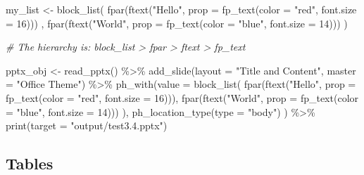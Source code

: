 \documentclass[
]{book}
\newenvironment{Shaded}{\begin{snugshade}}{\end{snugshade}}
\newcommand{\AttributeTok}[1]{\textcolor[rgb]{0.77,0.63,0.00}{#1}}
\newcommand{\CommentTok}[1]{\textcolor[rgb]{0.56,0.35,0.01}{\textit{#1}}}
\newcommand{\DecValTok}[1]{\textcolor[rgb]{0.00,0.00,0.81}{#1}}
\newcommand{\FunctionTok}[1]{\textcolor[rgb]{0.00,0.00,0.00}{#1}}
\newcommand{\NormalTok}[1]{#1}
\newcommand{\OtherTok}[1]{\textcolor[rgb]{0.56,0.35,0.01}{#1}}
\newcommand{\SpecialCharTok}[1]{\textcolor[rgb]{0.00,0.00,0.00}{#1}}
\newcommand{\StringTok}[1]{\textcolor[rgb]{0.31,0.60,0.02}{#1}}
\begin{document}
\begin{Shaded}
\begin{Highlighting}[]
\NormalTok{my\_list }\OtherTok{\textless{}{-}} \FunctionTok{block\_list}\NormalTok{(}
  \FunctionTok{fpar}\NormalTok{(}\FunctionTok{ftext}\NormalTok{(}\StringTok{"Hello"}\NormalTok{, }\AttributeTok{prop =} \FunctionTok{fp\_text}\NormalTok{(}\AttributeTok{color =} \StringTok{"red"}\NormalTok{, }\AttributeTok{font.size =} \DecValTok{16}\NormalTok{))) ,}
  \FunctionTok{fpar}\NormalTok{(}\FunctionTok{ftext}\NormalTok{(}\StringTok{"World"}\NormalTok{, }\AttributeTok{prop =} \FunctionTok{fp\_text}\NormalTok{(}\AttributeTok{color =} \StringTok{"blue"}\NormalTok{, }\AttributeTok{font.size =} \DecValTok{14}\NormalTok{)))}
\NormalTok{  )}

\CommentTok{\# The hierarchy is: \textasciigrave{}block\_list \textgreater{} fpar \textgreater{} ftext \textgreater{} fp\_text\textasciigrave{}}

\NormalTok{pptx\_obj }\OtherTok{\textless{}{-}} \FunctionTok{read\_pptx}\NormalTok{() }\SpecialCharTok{\%\textgreater{}\%}
  \FunctionTok{add\_slide}\NormalTok{(}\AttributeTok{layout =} \StringTok{"Title and Content"}\NormalTok{, }\AttributeTok{master =} \StringTok{"Office Theme"}\NormalTok{) }\SpecialCharTok{\%\textgreater{}\%}
  \FunctionTok{ph\_with}\NormalTok{(}\AttributeTok{value =} \FunctionTok{block\_list}\NormalTok{(}
    \FunctionTok{fpar}\NormalTok{(}\FunctionTok{ftext}\NormalTok{(}\StringTok{"Hello"}\NormalTok{, }\AttributeTok{prop =} \FunctionTok{fp\_text}\NormalTok{(}\AttributeTok{color =} \StringTok{"red"}\NormalTok{, }\AttributeTok{font.size =} \DecValTok{16}\NormalTok{))),}
    \FunctionTok{fpar}\NormalTok{(}\FunctionTok{ftext}\NormalTok{(}\StringTok{"World"}\NormalTok{, }\AttributeTok{prop =} \FunctionTok{fp\_text}\NormalTok{(}\AttributeTok{color =} \StringTok{"blue"}\NormalTok{, }\AttributeTok{font.size =} \DecValTok{14}\NormalTok{)))}
\NormalTok{    ),}
    \FunctionTok{ph\_location\_type}\NormalTok{(}\AttributeTok{type =} \StringTok{"body"}\NormalTok{)}
\NormalTok{  ) }\SpecialCharTok{\%\textgreater{}\%}
  \FunctionTok{print}\NormalTok{(}\AttributeTok{target =} \StringTok{"output/test3.4.pptx"}\NormalTok{) }
\end{Highlighting}
\end{Shaded}

\hypertarget{tables}{%
\subsection{Tables}\label{tables}}
\end{document}
